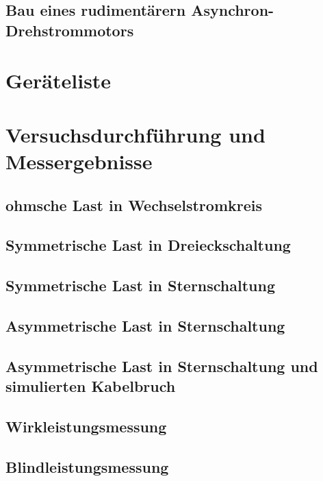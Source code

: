 \documentclass[12pt,english,ngerman]{scrartcl}
\begin{document}
\subsection{Bau eines rudimentärern Asynchron-Drehstrommotors}





\section{Geräteliste}
\label{sec:geraeteliste}





\section{Versuchsdurchführung und Messergebnisse}
\label{sec:versuchsdurchfuehrung_messergebnisse}

\subsection{ohmsche Last in Wechselstromkreis}


\subsection{Symmetrische Last in Dreieckschaltung}


\subsection{Symmetrische Last in Sternschaltung}


\subsection{Asymmetrische Last in Sternschaltung}


\subsection{Asymmetrische Last in Sternschaltung und simulierten Kabelbruch}


\subsection{Wirkleistungsmessung}


\subsection{Blindleistungsmessung}
\end{document}
